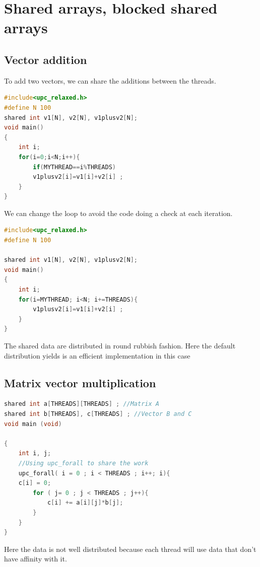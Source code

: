 \documentclass{report}
\begin{document}
\chapter{Shared arrays, blocked shared arrays}



\section{Vector addition}

To add two vectors, we can share the additions between the threads.

\begin{lstlisting}[language=C]
#include<upc_relaxed.h> 
#define N 100 
shared int v1[N], v2[N], v1plusv2[N]; 
void main() 
{ 
    int i; 
    for(i=0;i<N;i++){
        if(MYTHREAD==i%THREADS) 
        v1plusv2[i]=v1[i]+v2[i] ; 
    }
}
\end{lstlisting}

    We can change the loop to avoid the code doing a check at each iteration.

\begin{lstlisting}[language=C]
#include<upc_relaxed.h> 
#define N 100 

shared int v1[N], v2[N], v1plusv2[N]; 
void main() 
{ 
    int i; 
    for(i=MYTHREAD; i<N; i+=THREADS){
        v1plusv2[i]=v1[i]+v2[i] ; 
    }
}
\end{lstlisting}

The shared data are distributed in round rubbish fashion. Here the default distribution yields is an efficient implementation in this case

\section{Matrix vector multiplication}

\begin{lstlisting}[language=C]
shared int a[THREADS][THREADS] ; //Matrix A
shared int b[THREADS], c[THREADS] ; //Vector B and C
void main (void) 

{
    int i, j; 
    //Using upc_forall to share the work
    upc_forall( i = 0 ; i < THREADS ; i++; i){
    c[i] = 0;
        for ( j= 0 ; j < THREADS ; j++){
            c[i] += a[i][j]*b[j];
        }
    }
}
\end{lstlisting}

Here the data is not well distributed because each thread will use data that don't have affinity with it.
\end{document}
